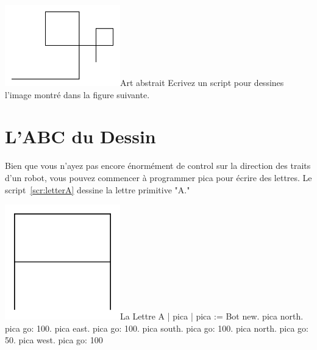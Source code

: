\documentclass[a4paper,10pt,twoside]{book}
\begin{document}
\begin{exofigwithsize}[0.5]{\includegraphics[width=5cm]{turtleMArtNouveau}}{Art abstrait}\label{xp:art}
Ecrivez un script pour dessines l'image montr\'e dans la figure suivante. 
\end{exofigwithsize}


\section{L'ABC du Dessin}

Bien que vous n'ayez pas encore \'enorm\'ement de control sur la direction des traits d'un robot, vous pouvez commencer 
\`a programmer pica pour \'ecrire des lettres. Le script~\ref{scr:letterA} dessine la lettre primitive "A." 



\begin{scriptfigwithsize}[0.4]{\includegraphics[width=5cm]{turtleMLetterA}}{La Lettre A}\label{scr:letterA}
	| pica | 
	pica := Bot new. 
	pica north. 
	pica go: 100. 
	pica east. 
	pica go: 100. 
	pica south. 
	pica go: 100. 
	pica north. 
	pica go: 50. 
	pica west. 
	pica go: 100
\end{scriptfigwithsize}
\end{document}
